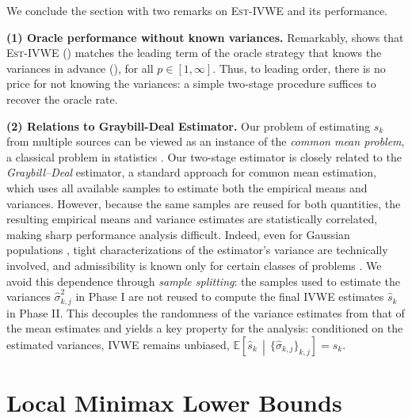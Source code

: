 \documentclass{article}
\theoremstyle{plain}
\theoremstyle{definition}
\theoremstyle{plain}
\newcommand{\estivwe}{\textsc{Est-IVWE}}
\newcommand{\ivwe}{\textsc{IVWE}}
\begin{document}
We conclude the section with two remarks on \estivwe{} and its performance.

{\bf (1) Oracle performance without known variances.} Remarkably,  shows that \estivwe{} () matches the leading term of the oracle strategy that knows the variances in advance (), for all \(p \in [1,\infty]\). Thus, to leading order, there is no price for not knowing the variances: a simple two-stage procedure suffices to recover the oracle rate.









{\bf (2) Relations to Graybill-Deal Estimator.} Our problem of estimating \(s_k\) from multiple sources can be viewed as an instance of the \emph{common mean problem}, a classical problem in statistics \citep{graybill-deal,pal2007revisit}. Our two-stage estimator is closely related to the \emph{Graybill--Deal} estimator, a standard approach for common mean estimation, which uses all available samples to estimate both the empirical means and variances. However, because the same samples are reused for both quantities, the resulting empirical means and variance estimates are statistically correlated, making sharp performance analysis difficult. Indeed, even for Gaussian populations \citep{nair1980,voinov1984}, tight characterizations of the estimator's variance are technically involved, and admissibility is known only for certain classes of problems \citep{ghosh-sinha,sinha-mouqadem,pal1997admissible}. We avoid this dependence through \emph{sample splitting}: the samples used to estimate the variances \(\hat{\sigma}_{k,j}^2\) in Phase I are not reused to compute the final \ivwe{} estimates \(\hat{s}_k\) in Phase II. This decouples the randomness of the variance estimates from that of the mean estimates and yields a key property for the analysis: conditioned on the estimated variances, \ivwe{} remains unbiased,
\(
\mathbb{E}\!\left[\hat{s}_k \,\middle|\, \{\hat{\sigma}_{k,j}\}_{k,j}\right] = s_k .
\)















\section{Local Minimax Lower Bounds}
\label{sec:lower-bound}
\end{document}
